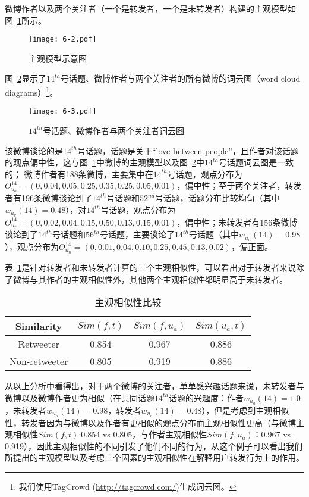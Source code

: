 微博作者以及两个关注者（一个是转发者，一个是未转发者）构建的主观模型如图~\ref{fig6-2}所示。

\begin{figure}[htb]
\centering
\texttt{[image: 6-2.pdf]}
\caption{主观模型示意图}
\label{fig6-2}
\end{figure}
图~\ref{fig6-3}显示了$ 14^{th} $号话题、微博作者与两个关注者的所有微博的词云图（word cloud diagrams）\footnote{我们使用TagCrowd (\url{http://tagcrowd.com/})生成词云图。}。

\begin{figure}[htb]
\centering
\texttt{[image: 6-3.pdf]}
\caption{$ 14^{th} $号话题、微博作者与两个关注者词云图}
\label{fig6-3}
\end{figure}

该微博谈论的是$ 14^{th} $号话题，话题是关于“love between people”，且作者对该话题的观点偏中性，这与图~\ref{fig6-2}中微博的主观模型以及图~\ref{fig6-3}中$ 14^{th} $号话题词云图是一致的；
微博作者有188条微博，主要集中在$ 14^{th} $号话题，观点分布为$O_{u_{a}}^{14} =( 0, 0.04, 0.05, 0.25, 0.35, 0.25, 0.05,  0.01 )$，偏中性；至于两个关注者，转发者有196条微博谈论到了$ 14^{th} $号话题和$ 52^{nd} $号话题，话题分布比较均匀（其中$ w_{u_{r}}(14)=0.48 $），对$ 14^{th} $号话题，观点分布为$O_{u_{r}}^{14} =( 0, 0.02, 0.04, 0.15, 0.50, 0.13,  0.15,  0.01)$，偏中性；未转发者有156条微博谈论到了$ 14^{th} $号话题和$ 56^{th} $号话题，主要谈论了$ 14^{th} $号话题（其中$ w_{u_{n}}(14)=0.98 $），观点分布为$O_{u_{n}}^{14} =( 0, 0.01, 0.04, 0.10, 0.25, 0.45, 0.13, 0.02)$，偏正面。

表~\ref{tab6-4}是针对转发者和未转发者计算的三个主观相似性，可以看出对于转发者来说除了微博与其作者的主观相似性外，其他两个主观相似性都明显高于未转发者。

\begin{table}[htp]
\centering
\caption{主观相似性比较}
\label{tab6-4}
\begin{tabular}{|c|c|c|c|}
\hline
Similarity & $ Sim(f,t) $ & $ Sim(f,u_a)  $ & $ Sim(u_a,t)  $\\
\hline
Retweeter & 0.854 & 0.967 & 0.886\\
\hline
Non-retweeter & 0.805 & 0.919 & 0.886\\
\hline
\end{tabular}
\end{table} 

从以上分析中看得出，对于两个微博的关注者，单单感兴趣话题来说，未转发者与微博以及微博作者更为相似（在共同话题$ 14^{th} $话题的兴趣度：作者$ w_{u_{a}}(14)=1.0 $，未转发者$ w_{u_{n}}(14)=0.98 $，转发者$ w_{u_{r}}(14)=0.48 $），但是考虑到主观相似性，转发者因为与微博以及作者有更相似的观点分布而主观相似性更高（与微博主观相似性$ Sim(f,t)$:0.854 vs 0.805，与作者主观相似性$ Sim(f,u_a)  $：0.967 vs 0.919），因此主观相似性的不同引发了他们不同的行为，从这个例子可以看出我们所提出的主观模型以及考虑三个因素的主观相似性在解释用户转发行为上的作用。

